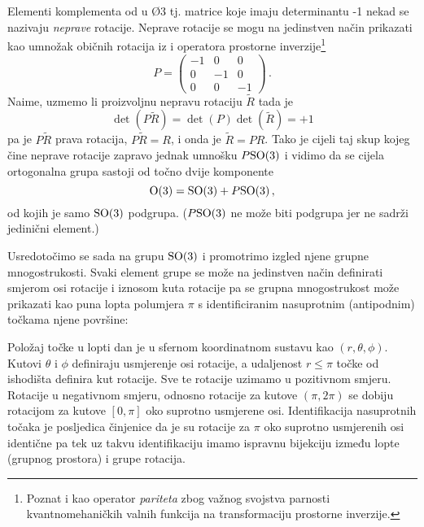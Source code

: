 Elementi komplementa od  u \O{3} tj. matrice koje imaju determinantu -1 nekad se 
nazivaju \emph{neprave} rotacije.
Neprave rotacije se mogu na jedinstven
način prikazati kao umnožak običnih rotacija iz  i operatora 
prostorne inverzije\footnote{Poznat i kao operator \emph{pariteta} zbog
    važnog svojstva parnosti kvantnomehaničkih valnih funkcija na transformaciju
prostorne inverzije.}
\begin{equation}
P = \begin{pmatrix}
-1 & 0 & 0 \\ 
0  &-1 & 0 \\
0  & 0 & -1
\end{pmatrix} \,.
\end{equation}
Naime, uzmemo li proizvoljnu nepravu rotaciju $\tilde{R}$ tada
je 
\begin{equation}
\det (P \tilde{R}) = \det(P) \det(\tilde{R}) = +1     
\end{equation}
pa je $P\tilde{R}$ 
prava rotacija, $P\tilde{R} = R$,
i onda je $\tilde{R} = P R$. Tako je cijeli taj skup
kojeg čine neprave rotacije zapravo jednak umnošku $P\mathrm{SO}(3)$ i vidimo da
se cijela ortogonalna grupa sastoji od točno dvije komponente
\begin{equation}
    \mathrm{O}(3) = \mathrm{SO}(3) + P\mathrm{SO}(3)\,,
    \label{eq:so3Pso3}
\end{equation}
od kojih je samo $\mathrm{SO}(3)$ podgrupa. ($P\mathrm{SO}(3)$ ne može biti podgrupa jer ne sadrži
jedinični element.)

Usredotočimo se sada na grupu $\mathrm{SO}(3)$ i promotrimo izgled njene grupne mnogostrukosti.
Svaki element grupe  se može na jedinstven način definirati
smjerom osi rotacije i iznosom kuta rotacije pa se grupna mnogostrukost
može prikazati kao puna lopta polumjera $\pi$ s identificiranim nasuprotnim
(antipodnim) točkama njene površine:

\centerline{}

Položaj točke u lopti dan je u sfernom koordinatnom sustavu kao
$(r, \theta, \phi)$. Kutovi $\theta$ i $\phi$ definiraju usmjerenje
osi rotacije, a udaljenost $r \le \pi$ točke od ishodišta definira kut rotacije.
Sve te rotacije uzimamo u pozitivnom smjeru. Rotacije u negativnom smjeru,
odnosno rotacije za 
kutove $(\pi, 2\pi)$ se dobiju rotacijom za kutove $[0, \pi]$ oko
suprotno usmjerene osi. Identifikacija nasuprotnih točaka je posljedica
činjenice da je su rotacije za $\pi$ oko suprotno usmjerenih osi
identične pa tek uz takvu identifikaciju imamo ispravnu bijekciju
između lopte (grupnog prostora) i  grupe rotacija. 

